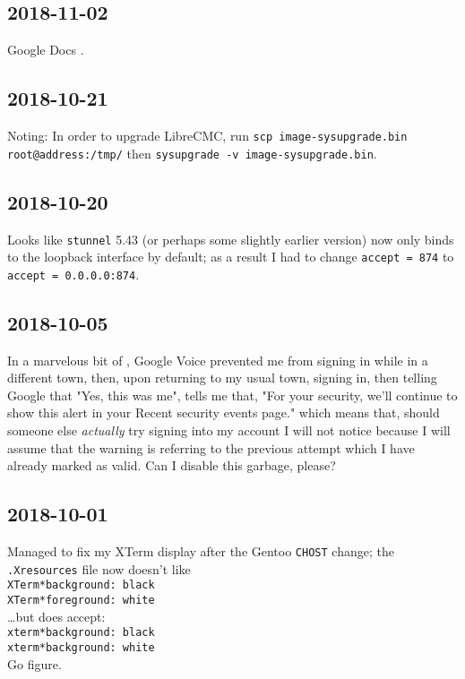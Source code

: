 \documentclass{article}
\begin{document}
\subsection{2018-11-02}
Google Docs .

\subsection{2018-10-21}
Noting: In order to upgrade LibreCMC, run \texttt{scp image-sysupgrade.bin root@address:/tmp/} then \texttt{sysupgrade -v image-sysupgrade.bin}.

\subsection{2018-10-20}
Looks like \texttt{stunnel} 5.43 (or perhaps some slightly earlier version) now only binds to the loopback interface by default; as a result I had to change \texttt{accept = 874} to \texttt{accept = 0.0.0.0:874}.

\subsection{2018-10-05}
In a marvelous bit of , Google Voice prevented me from signing in while in a different town, then, upon returning to my usual town, signing in, then telling Google that "Yes, this was me", tells me that, "For your security, we'll continue to show this alert in your Recent security events page." which means that, should someone else \emph{actually} try signing into my account I will not notice because I will assume that the warning is referring to the previous attempt which I have already marked as valid.  Can I disable this garbage, please?

\subsection{2018-10-01}
Managed to fix my XTerm display after the Gentoo \texttt{CHOST} change; the \texttt{.Xresources} file now doesn't like \\
    \texttt{XTerm*background: black} \\
    \texttt{XTerm*foreground: white} \\
\ldots but does accept: \\
    \texttt{xterm*background: black} \\
    \texttt{xterm*background: white} \\
Go figure.
\end{document}
